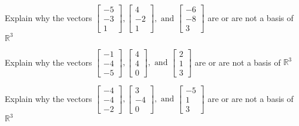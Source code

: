 \documentclass{article}
\begin{document}
\begin{exerciseStatement}
    Explain why the vectors \(\left[\begin{array}{r}
-5 \\
-3 \\
1
\end{array}\right] , \left[\begin{array}{r}
4 \\
-2 \\
1
\end{array}\right] , \text{ and } \left[\begin{array}{r}
-6 \\
-8 \\
3
\end{array}\right]\) are or are not a basis of \(\mathbb{R}^3\)


  
\end{exerciseStatement}

\begin{exerciseStatement}
    Explain why the vectors \(\left[\begin{array}{r}
-1 \\
-4 \\
-5
\end{array}\right] , \left[\begin{array}{r}
4 \\
4 \\
0
\end{array}\right] , \text{ and } \left[\begin{array}{r}
2 \\
1 \\
3
\end{array}\right]\) are or are not a basis of \(\mathbb{R}^3\)


  
\end{exerciseStatement}

\begin{exerciseStatement}
    Explain why the vectors \(\left[\begin{array}{r}
-4 \\
-4 \\
-2
\end{array}\right] , \left[\begin{array}{r}
3 \\
-4 \\
0
\end{array}\right] , \text{ and } \left[\begin{array}{r}
-5 \\
1 \\
3
\end{array}\right]\) are or are not a basis of \(\mathbb{R}^3\)


  
\end{exerciseStatement}
\end{document}
